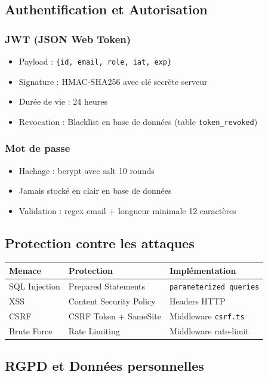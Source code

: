 \documentclass[11pt,a4paper]{article}
\begin{document}
\subsection{Authentification et Autorisation}

\subsubsection{JWT (JSON Web Token)}
\begin{itemize}
  \item Payload : \texttt{\{id, email, role, iat, exp\}}
  \item Signature : HMAC-SHA256 avec clé secrète serveur
  \item Durée de vie : 24 heures
  \item Revocation : Blacklist en base de données (table \texttt{token\_revoked})
\end{itemize}

\subsubsection{Mot de passe}
\begin{itemize}
  \item Hachage : bcrypt avec salt 10 rounds
  \item Jamais stocké en clair en base de données
  \item Validation : regex email + longueur minimale 12 caractères
\end{itemize}

\subsection{Protection contre les attaques}

\begin{tabular}{lll}
\toprule
\textbf{Menace} & \textbf{Protection} & \textbf{Implémentation} \\
\midrule
SQL Injection & Prepared Statements & \texttt{parameterized queries} \\
XSS & Content Security Policy & Headers HTTP \\
CSRF & CSRF Token + SameSite & Middleware \texttt{csrf.ts} \\
Brute Force & Rate Limiting & Middleware rate-limit \\
\bottomrule
\end{tabular}

\subsection{RGPD et Données personnelles}
\end{document}
